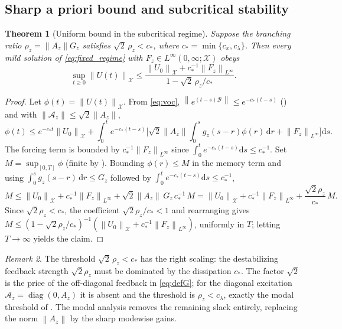 \documentclass[11pt]{article}
\theoremstyle{plain}
\newtheorem{theorem}{Theorem}[section]
\theoremstyle{definition}
\theoremstyle{remark}
\newtheorem{remark}[theorem]{Remark}
\newcommand{\X}{\mathcal{X}}
\newcommand{\Bop}{\mathcal{B}}
\newcommand{\norm}[1]{\left\lVert #1 \right\rVert}
\newcommand{\dd}{\mathrm{d}}
\newcommand{\branch}{\rho}
\DeclareMathOperator{\diag}{diag}
\begin{document}
\subsection{Sharp a priori bound and subcritical stability}

\begin{theorem}[Uniform bound in the subcritical regime]
\label{thm:apriori}
Suppose the branching ratio $\branch_z=\norm{A_z}G_z$ satisfies $\sqrt2\,\branch_z<c_\ast$, where
$c_\ast=\min\{c_x,c_\lambda\}$. Then every mild solution of \eqref{eq:fixed_regime} with
$F_z\in L^\infty(0,\infty;\X)$ obeys
\begin{equation}
\sup_{t\ge0}\norm{U(t)}_\X\le\frac{\norm{U_0}_\X+c_\ast^{-1}\norm{F_z}_{L^\infty}}{1-\sqrt2\,\branch_z/c_\ast}.
\end{equation}
\end{theorem}

\begin{proof}
Let $\phi(t)=\norm{U(t)}_\X$. From \eqref{eq:voc}, $\norm{e^{(t-s)\Bop}}\le e^{-c_\ast(t-s)}$
() and  with
$\norm{\mathcal{A}_z}\le\sqrt2\norm{A_z}$,
\[
\phi(t)\le e^{-c_\ast t}\norm{U_0}_\X
+\int_0^t e^{-c_\ast(t-s)}\Big[\sqrt2\norm{A_z}\!\int_0^s g_z(s-r)\phi(r)\,\dd r+\norm{F_z}_{L^\infty}\Big]\dd s .
\]
The forcing term is bounded by $c_\ast^{-1}\norm{F_z}_{L^\infty}$ since
$\int_0^t e^{-c_\ast(t-s)}\dd s\le c_\ast^{-1}$. Set $M=\sup_{[0,T]}\phi$ (finite by
). Bounding $\phi(r)\le M$ in the memory term and using
$\int_0^s g_z(s-r)\,\dd r\le G_z$ followed by $\int_0^t e^{-c_\ast(t-s)}\dd s\le c_\ast^{-1}$,
\[
M\le\norm{U_0}_\X+c_\ast^{-1}\norm{F_z}_{L^\infty}
+\sqrt2\norm{A_z}\,G_z\,c_\ast^{-1}\,M
=\norm{U_0}_\X+c_\ast^{-1}\norm{F_z}_{L^\infty}+\frac{\sqrt2\branch_z}{c_\ast}\,M .
\]
Since $\sqrt2\branch_z<c_\ast$, the coefficient $\sqrt2\branch_z/c_\ast<1$ and rearranging gives
$M\le(1-\sqrt2\branch_z/c_\ast)^{-1}(\norm{U_0}_\X+c_\ast^{-1}\norm{F_z}_{L^\infty})$, uniformly in
$T$; letting $T\to\infty$ yields the claim.
\end{proof}

\begin{remark}
The threshold $\sqrt2\,\branch_z<c_\ast$ has the right scaling: the destabilizing feedback
strength $\sqrt2\branch_z$ must be dominated by the dissipation $c_\ast$. The factor $\sqrt2$ is
the price of the off-diagonal feedback in \eqref{eq:defG}; for the diagonal excitation
$\mathcal{A}_z=\diag(0,A_z)$ it is absent and the threshold is $\branch_z<c_\lambda$, exactly the
modal threshold of . The modal analysis removes the remaining slack entirely,
replacing the norm $\norm{A_z}$ by the sharp modewise gains.
\end{remark}
\end{document}
